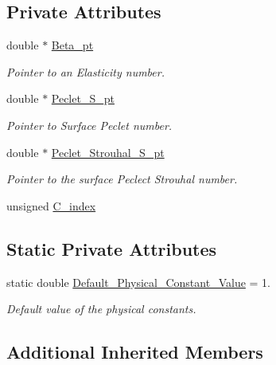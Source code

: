 \subsection*{Private Attributes}
\begin{DoxyCompactItemize}
\item 
double $\ast$ \hyperlink{classoomph_1_1SpineAxisymmetricMarangoniSurfactantFluidInterfaceElement_a3884b52470fdf8d031224e2f7060e56d}{Beta\+\_\+pt}
\begin{DoxyCompactList}\small\item\em Pointer to an Elasticity number. \end{DoxyCompactList}\item 
double $\ast$ \hyperlink{classoomph_1_1SpineAxisymmetricMarangoniSurfactantFluidInterfaceElement_a71f8f35b8f8db2341c9eedee754c957a}{Peclet\+\_\+\+S\+\_\+pt}
\begin{DoxyCompactList}\small\item\em Pointer to Surface Peclet number. \end{DoxyCompactList}\item 
double $\ast$ \hyperlink{classoomph_1_1SpineAxisymmetricMarangoniSurfactantFluidInterfaceElement_a8e2a9a53bcc19471bcb36ed2c169fb57}{Peclet\+\_\+\+Strouhal\+\_\+\+S\+\_\+pt}
\begin{DoxyCompactList}\small\item\em Pointer to the surface Peclect Strouhal number. \end{DoxyCompactList}\item 
unsigned \hyperlink{classoomph_1_1SpineAxisymmetricMarangoniSurfactantFluidInterfaceElement_a81a18102b611767a582804f1acdc8143}{C\+\_\+index}
\end{DoxyCompactItemize}
\subsection*{Static Private Attributes}
\begin{DoxyCompactItemize}
\item 
static double \hyperlink{classoomph_1_1SpineAxisymmetricMarangoniSurfactantFluidInterfaceElement_a652e8408b5cc7af8b934d895782b8ff5}{Default\+\_\+\+Physical\+\_\+\+Constant\+\_\+\+Value} = 1.
\begin{DoxyCompactList}\small\item\em Default value of the physical constants. \end{DoxyCompactList}\end{DoxyCompactItemize}
\subsection*{Additional Inherited Members}



